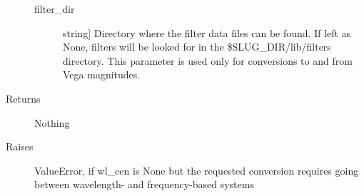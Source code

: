 \documentclass[letterpaper,10pt,english]{sphinxmanual}
\begin{document}
\begin{fulllineitems}
\begin{description}
\begin{description}
\item[{filter\_dir}] \leavevmode{[}string{]}
Directory where the filter data files can be found. If left as
None, filters will be looked for in the \$SLUG\_DIR/lib/filters
directory. This parameter is used only for conversions to
and from Vega magnitudes.

\end{description}

\item[{Returns}] \leavevmode
Nothing

\item[{Raises}] \leavevmode
ValueError, if wl\_cen is None but the requested conversion
requires going between wavelength- and frequency-based systems

\end{description}

\end{fulllineitems}

\end{document}
